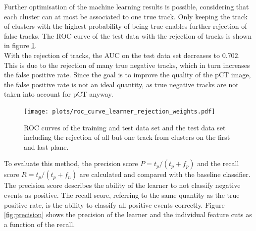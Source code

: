 Further optimisation of the machine learning results is possible, considering that each cluster can at most be associated to one true track.
Only keeping the track of clusters with the highest probability of being true enables further rejection of
false tracks. The ROC curve of the test data with the rejection of tracks is shown in figure \ref{fig:rejection}. \\
With the rejection of tracks, the AUC on the test data set decreases to $0.702$. This is due to the rejection of many true negative tracks, which in turn increases
the false positive rate. Since the goal is to improve the quality of the pCT image, the false positive rate is not an ideal quantity, as true negative tracks
are not taken into account for pCT anyway.

\begin{figure}[H]
  \centering
  \texttt{[image: plots/roc\_curve\_learner\_rejection\_weights.pdf]}
  \caption{ROC curves of the training and test data set and the test data set including the rejection of all but one track from clusters on the first and last plane.}
  \label{fig:rejection}
\end{figure}

To evaluate this method, the precision score $P=t_p/(t_p + f_p)$ and the recall score $R=t_p/(t_p + f_n)$ are calculated and compared with the baseline classifier. The precision
score describes the ability of the learner to not classify negative events as positive. The recall score, referring to the same quantity as the true positive rate,
is the ability to classify all positive events correctly.
Figure \ref{fig:precision} shows the precision of the learner and the individual feature cuts as a function of the recall.


